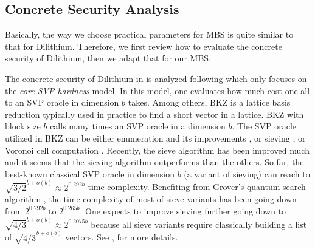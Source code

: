 \documentclass[conference]{IEEEtran}
\begin{document}
		\subsection{Concrete Security Analysis} \label{csa}
		
			Basically, the way we choose practical parameters for \textsf{MBS} is quite similar to that for \textsf{Dilithium}. Therefore, we first review how to evaluate the concrete security of \textsf{Dilithium}, then we adapt that for our \textsf{MBS}.
		
		The concrete security of \textsf{Dilithium} in \cite{DKL+19} is analyzed  following \cite{ADPS16, APS15,  AAB+19} which only focuses on the \textit{core \textsf{SVP} hardness} model. In this model, one evaluates how much cost one all to an \textsf{SVP} oracle in dimension $b$ takes. Among others, BKZ is a lattice basis reduction  typically used in practice to find a short vector in a lattice. BKZ with block size $b$ calls many times an \textsf{SVP} oracle in a dimension $b$. The \textsf{SVP} oracle utilized in BKZ can be either enumeration and its improvements \cite{SE94, GNR10, AN17}, or sieving \cite{Ajtai01, Bec16, Laar2015}, or Voronoi cell computation \cite{MV13}. Recently, the sieve algorithm has been improved much and it seems that the sieving algorithm outperforms than the others.  So far, the best-known classical \textsf{SVP} oracle in dimension $b$ (a variant of sieving) can reach to $\sqrt{3/2}^{b+o(b)} \approx 2^{0.292b}$ time  complexity. Benefiting from Grover's quantum search algorithm \cite{Gro96}, the time complexity of most of sieve variants has been going down from $2^{0.292b}$ to  $2^{0.265b}$. One expects to improve sieving further going down to $\sqrt{4/3}^{b+o(b)}\approx2^{0.2075b}$ because all sieve variants require classically building a list of $\sqrt{4/3}^{b+o(b)}$ vectors. See \cite[4.2]{AAB+19}, \cite[Appedix C]{DKL+19} for more details. 
		
\end{document}
